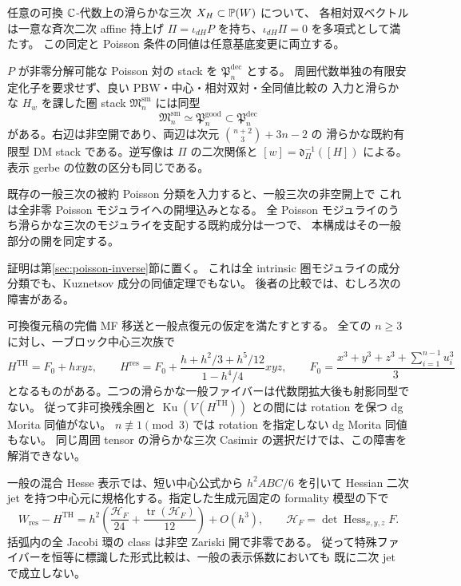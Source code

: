 \begin{maintheorem}
任意の可換 $\mathbb C$-代数上の滑らかな三次 $X_H\subset\mathbb P(W)$ について、
各相対双ベクトルは一意な斉次二次 affine 持上げ
$\Pi=\iota_{dH}P$ を持ち、$\iota_{dH}\Pi=0$ を多項式として満たす。
この同定と Poisson 条件の同値は任意基底変更に両立する。

$P$ が非零分解可能な Poisson 対の stack を $\mathfrak P_n^{\mathrm{dec}}$ とする。
周囲代数単独の有限安定化子を要求せず、良い PBW・中心・相対双対・全同値比較の
入力と滑らかな $H_w$ を課した圏 stack $\mathfrak M_n^{\mathrm{sm}}$ には同型
\[
 \mathfrak M_n^{\mathrm{sm}}\simeq
 \mathfrak P_n^{\mathrm{good}}\subset\mathfrak P_n^{\mathrm{dec}}
\]
がある。右辺は非空開であり、両辺は次元 $\binom{n+2}{3}+3n-2$ の
滑らかな既約有限型 DM stack である。逆写像は $\Pi$ の二次関係と
$[w]=\mathfrak d_\Pi^{-1}([H])$ による。表示 gerbe の位数の区分も同じである。

既存の一般三次の被約 Poisson 分類を入力すると、一般三次の非空開上で
これは全非零 Poisson モジュライへの開埋込みとなる。
全 Poisson モジュライのうち滑らかな三次のモジュライを支配する既約成分は一つで、
本構成はその一般部分の開を同定する。
\end{maintheorem}

証明は第\ref{sec:poisson-inverse}節に置く。
これは全 intrinsic 圏モジュライの成分分類でも、Kuznetsov 成分の同値定理でもない。
後者の比較では、むしろ次の障害がある。

\begin{maintheorem}[残余復元との比較障害]
可換復元稿の完備 MF 移送と一般点復元の仮定を満たすとする。
全ての $n\ge3$ に対し、一ブロック中心三次族で
\[
 H^{\mathrm{TH}}=F_0+hxyz,\qquad
 H^{\mathrm{res}}=F_0+
 \frac{h+h^2/3+h^5/12}{1-h^4/4}xyz,\qquad
 F_0=\frac{x^3+y^3+z^3+\sum_{i=1}^{n-1}u_i^3}{3}
\]
となるものがある。二つの滑らかな一般ファイバーは代数閉拡大後も射影同型でない。
従って非可換残余圏と $\operatorname{Ku}(V(H^{\mathrm{TH}}))$ との間には
rotation を保つ dg Morita 同値がない。
$n\not\equiv1\pmod3$ では rotation を指定しない dg Morita 同値もない。
同じ周囲 tensor の滑らかな三次 Casimir の選択だけでは、この障害を解消できない。

一般の混合 Hesse 表示では、短い中心公式から $h^2ABC/6$ を引いて
Hessian 二次 jet を持つ中心元に規格化する。指定した生成元固定の formality 模型の下で
\[
 W_{\mathrm{res}}-H^{\mathrm{TH}}
 =h^2\left(\frac{\mathscr H_F}{24}
       +\frac{\operatorname{tr}(\mathscr H_F)}{12}\right)+O(h^3),
 \qquad \mathscr H_F=\det\operatorname{Hess}_{x,y,z}F.
\]
括弧内の全 Jacobi 環の class は非空 Zariski 開で非零である。
従って特殊ファイバーを恒等に標識した形式比較は、一般の表示係数においても
既に二次 jet で成立しない。
\end{maintheorem}


